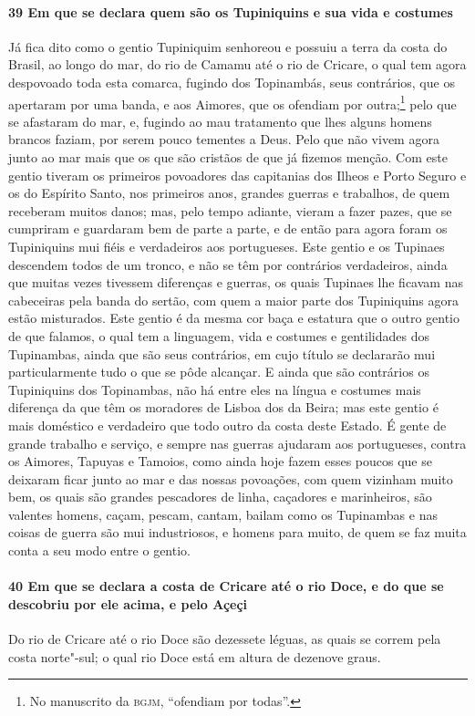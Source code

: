 \begin{linenumbers}
\paragraph{39 Em que se declara quem são os Tupiniquins e sua vida e costumes} \quad
Já fica dito como o gentio Tupiniquim senhoreou e possuiu a terra da costa do Brasil, ao
longo do mar, do rio de Camamu até o rio de Cricare, o qual tem agora despovoado toda esta
comarca, fugindo dos Topinambás, seus contrários, que os apertaram por uma banda, e aos
Aimores, que os ofendiam por outra;\footnote{ No manuscrito da \textsc{bgjm}, ``ofendiam
por todas''.} pelo que se afastaram do mar, e, fugindo ao mau tratamento que lhes alguns
homens brancos faziam, por serem pouco tementes a Deus. Pelo que não vivem agora junto ao
mar mais que os que são cristãos de que já fizemos menção. Com este gentio tiveram os
primeiros povoadores das capitanias dos Ilheos e Porto Seguro e os do Espírito Santo, nos
primeiros anos, grandes guerras e trabalhos, de quem receberam muitos danos; mas, pelo
tempo adiante, vieram a fazer pazes, que se cumpriram e guardaram bem de parte a parte, e
de então para agora foram os Tupiniquins mui fiéis e verdadeiros aos portugueses. Este
gentio e os Tupinaes descendem todos de um tronco, e não se têm por contrários
verdadeiros, ainda que muitas vezes tivessem diferenças e guerras, os quais Tupinaes lhe
ficavam nas cabeceiras pela banda do sertão, com quem a maior parte dos Tupiniquins agora
estão misturados. Este gentio é da mesma cor baça e estatura que o outro gentio de que
falamos, o qual tem a linguagem, vida e costumes e gentilidades dos Tupinambas, ainda que
são seus contrários, em cujo título se declararão mui particularmente tudo o que se pôde
alcançar. E ainda que são contrários os Tupiniquins dos Topinambas, não há entre eles na
língua e costumes mais diferença da que têm os moradores de Lisboa dos da Beira; mas este
gentio é mais doméstico e verdadeiro que todo outro da costa deste Estado. É gente de
grande trabalho e serviço, e sempre nas guerras ajudaram aos portugueses, contra os
Aimores, Tapuyas e Tamoios, como ainda hoje fazem esses poucos que se deixaram ficar junto
ao mar e das nossas povoações, com quem vizinham muito bem, os quais são grandes
pescadores de linha, caçadores e marinheiros, são valentes homens, caçam, pescam, cantam,
bailam como os Tupinambas e nas coisas de guerra são mui industriosos, e homens para
muito, de quem se faz muita conta a seu modo entre o gentio.

\paragraph{40 Em que se declara a costa de Cricare até o rio Doce, e do que se descobriu
por ele acima, e pelo Açeçi} \quad
Do rio de Cricare até o rio Doce são dezessete léguas, as quais se correm pela costa
norte"-sul; o qual rio Doce está em altura de dezenove graus.


\end{linenumbers}
